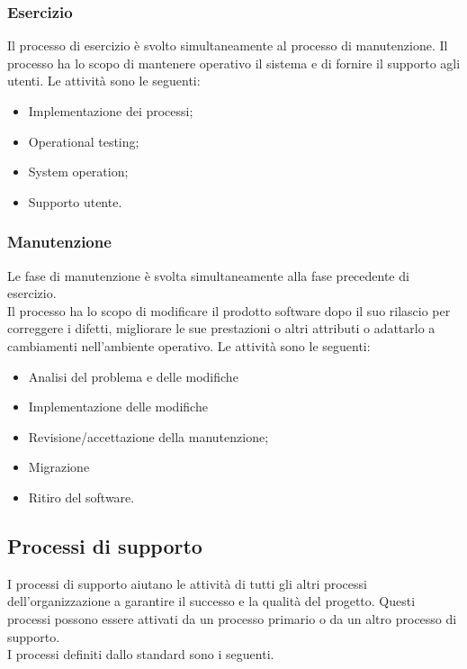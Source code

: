 \subsubsection{Esercizio}
Il processo di esercizio è svolto simultaneamente al processo di manutenzione. Il processo ha lo scopo di mantenere operativo il sistema e di fornire il supporto agli utenti. 
Le attività sono le seguenti:

\begin{itemize}

\item Implementazione dei processi;

\item Operational testing;

\item System operation;

\item Supporto utente.

\end{itemize}

\subsubsection{Manutenzione}
Le fase di manutenzione è svolta simultaneamente alla fase precedente di esercizio.\\
Il processo ha lo scopo di modificare il prodotto software dopo il suo rilascio per correggere i difetti, migliorare le sue prestazioni o altri attributi o adattarlo a cambiamenti nell'ambiente operativo.
Le attività sono le seguenti:

\begin{itemize}

\item Analisi del problema e delle modifiche

\item Implementazione delle modifiche

\item Revisione/accettazione della manutenzione;

\item Migrazione

\item Ritiro del software.

\end{itemize}

\subsection{Processi di supporto}
I processi di supporto aiutano le attività di tutti gli altri processi dell'organizzazione a garantire il successo e la qualità del progetto.
Questi processi possono essere attivati da un processo primario o da un altro processo di supporto. \\
I processi definiti dallo standard sono i seguenti.

